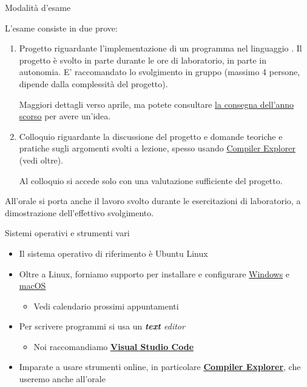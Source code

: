 \begin{frame}{Modalità d'esame}

  L'esame consiste in due prove:

  \begin{enumerate}

  \item Progetto riguardante l'implementazione di un programma nel linguaggio
    \Cpp{}. Il progetto è svolto in parte durante le ore di laboratorio, in
    parte in autonomia. E' raccomandato lo svolgimento in gruppo (massimo 4
    persone, dipende dalla complessità del progetto).

    Maggiori dettagli verso aprile, ma potete consultare
    \href{https://github.com/Programmazione-per-la-Fisica/progetto2023}{la
      consegna dell'anno scorso} per avere un'idea.

  \item Colloquio riguardante la discussione del progetto e domande
    teoriche e pratiche sugli argomenti svolti a lezione, spesso
    usando \href{https://godbolt.org/}{Compiler Explorer} (vedi oltre).

    Al colloquio si accede solo con una valutazione sufficiente del progetto.

  \end{enumerate}

  All'orale si porta anche il lavoro svolto durante le esercitazioni di
  laboratorio, a dimostrazione dell'effettivo svolgimento.

\end{frame}

\begin{frame}{Sistemi operativi e strumenti vari}
  \begin{itemize}[<+->]
  \item Il sistema operativo di riferimento è Ubuntu Linux
  \item Oltre a Linux, forniamo supporto per installare e configurare
    \href{https://github.com/Programmazione-per-la-Fisica/howto/blob/main/other-OSes/WSLGuide.md}{Windows}
    e
    \href{https://github.com/Programmazione-per-la-Fisica/howto/blob/main/other-OSes/macOSGuide.md}{macOS}
      \begin{itemize}[<.->]
      \item Vedi calendario prossimi appuntamenti
      \end{itemize}
  \item Per scrivere programmi si usa un \textit{\textbf{text} editor}
    \begin{itemize}[<.->]
    \item Noi raccomandiamo \href{https://code.visualstudio.com/}{\textbf{Visual
          Studio Code}}
    \end{itemize}
  \item Imparate a usare strumenti online, in particolare
    \href{https://godbolt.org/}{\textbf{Compiler Explorer}}, che
    useremo anche all'orale
  \end{itemize}

\end{frame}

